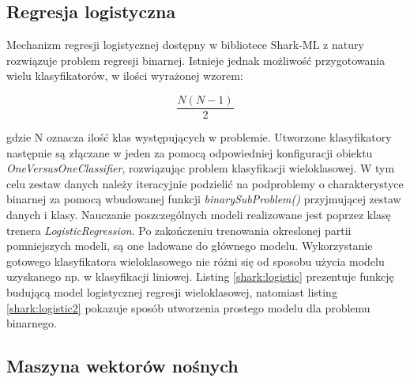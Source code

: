 

\subsection{Regresja logistyczna}

Mechanizm regresji logistycznej dostępny w bibliotece Shark-ML z natury rozwiązuje problem regresji binarnej. Istnieje jednak możliwość przygotowania wielu klasyfikatorów, w ilości wyrażonej wzorem:

\begin{equation}
	\frac{N(N-1)}{2}	
	\label{multiclass}
\end{equation}

gdzie N oznacza ilość klas występujących w problemie. Utworzone klasyfikatory następnie są złączane w jeden za pomocą odpowiedniej konfiguracji obiektu \textit{OneVersusOneClassifier}, rozwiązując problem klasyfikacji wieloklasowej. W tym celu zestaw danych należy iteracyjnie podzielić na podproblemy o charakterystyce binarnej za pomocą wbudowanej funkcji \textit{binarySubProblem()} przyjmującej zestaw danych i klasy. Nauczanie poszczególnych modeli realizowane jest poprzez klasę trenera \textit{LogisticRegression}. Po zakończeniu trenowania okreslonej partii pomniejszych modeli, są one ładowane do głównego modelu. Wykorzystanie gotowego klasyfikatora wieloklasowego nie różni się od sposobu użycia modelu uzyskanego np. w klasyfikacji liniowej. Listing \ref{shark:logistic} prezentuje funkcję budującą model logistycznej regresji wieloklasowej, natomiast listing \ref{shark:logistic2} pokazuje sposób utworzenia prostego modelu dla problemu binarnego.



\subsection{Maszyna wektorów nośnych}

